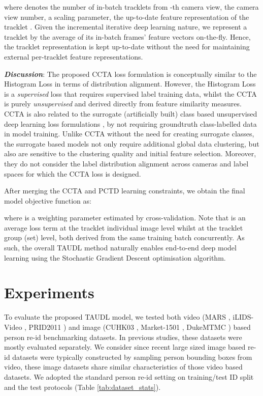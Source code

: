 \documentclass[runningheads]{llncs}
\begin{document}
where  denotes the number of in-batch tracklets from -th camera view,
 the camera view number, 
 a scaling parameter, 
 the up-to-date feature representation of the tracklet .
Given the incremental iterative deep learning nature,
we represent a tracklet  by
the average of its in-batch frames' feature vectors
on-the-fly.
Hence, the tracklet representation is kept up-to-date 
without the need for maintaining external per-tracklet feature representations.

\textbf{\em Discussion}:
The proposed CCTA loss formulation is conceptually 
similar to the Histogram Loss \cite{Ustinova2016hist}
in terms of distribution alignment.
However, the Histogram Loss is a {\em supervised} loss that requires
supervised label training data,
whilst the CCTA is purely {\em unsupervised} 
and derived directly from feature similarity measures. 
CCTA is also related to the surrogate (artificially built)
class based unsupervised deep learning loss formulations
\cite{bautista2017deep,bautista2016cliquecnn},
by not requiring groundtruth class-labelled data in model training.
Unlike CCTA without the need for creating surrogate classes, 
the surrogate based models not only require additional global data clustering,
but also are sensitive to the clustering quality and initial feature selection.
Moreover, they do not consider the label distribution alignment 
across cameras and label spaces for which
the CCTA loss is designed.

After merging the CCTA and PCTD learning constraints, we obtain the final 
model objective function as:

where  is a weighting parameter estimated by cross-validation.
Note that  is an average loss term at the
tracklet individual image level
whilst  at the tracklet group (set) level,
both derived from the same training batch concurrently.
As such, the overall TAUDL method naturally enables end-to-end deep model learning
using the Stochastic Gradient Descent optimisation algorithm.


\section{Experiments}

\noindent {}
To evaluate the proposed TAUDL model, we tested both
video ({MARS} \cite{zheng2016mars}, iLIDS-Video \cite{wang2014person}, PRID2011 \cite{hirzer2011person})
and 
image (CUHK03 \cite{li2014deepreid}, Market-1501
\cite{zheng2015scalable}, DukeMTMC \cite{ristani2016MTMC,zheng2017unlabeled})
based person re-id benchmarking datasets. 
In previous studies, these datasets were mostly evaluated separately.
We consider since recent large sized image based re-id datasets were typically constructed 
by sampling person bounding boxes from video, these image datasets share
similar characteristics of those video based datasets.
We adopted the standard person re-id setting on training/test ID split
and the test protocols (Table \ref{tab:dataset_stats}).
\end{document}
